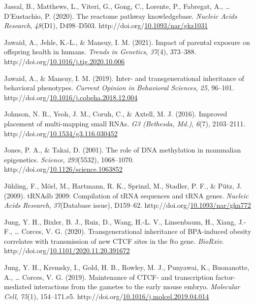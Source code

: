 \documentclass[12pt,twoside]{reedthesis}
\newlength{\cslhangindent}
\newenvironment{CSLReferences}[2] %
 {%
  \setlength{\parindent}{0pt}
  \ifodd #1 \everypar{\setlength{\hangindent}{\cslhangindent}}\ignorespaces\fi
  \ifnum #2 > 0
  \setlength{\parskip}{#2\baselineskip}
  \fi
 }%
 {}
\begin{document}
\begin{CSLReferences}{1}{0}
\leavevmode{}%
Jassal, B., Matthews, L., Viteri, G., Gong, C., Lorente, P., Fabregat, A., \ldots{} D'Eustachio, P. (2020). The reactome pathway knowledgebase. \emph{Nucleic Acids Research}, \emph{48}(D1), D498--D503. http://doi.org/\href{https://doi.org/10.1093/nar/gkz1031}{10.1093/nar/gkz1031}

\leavevmode{}%
Jawaid, A., Jehle, K.-L., \& Mansuy, I. M. (2021). Impact of parental exposure on offspring health in humans. \emph{Trends in Genetics}, \emph{37}(4), 373--388. http://doi.org/\href{https://doi.org/10.1016/j.tig.2020.10.006}{10.1016/j.tig.2020.10.006}

\leavevmode{}%
Jawaid, A., \& Mansuy, I. M. (2019). Inter- and transgenerational inheritance of behavioral phenotypes. \emph{Current Opinion in Behavioral Sciences}, \emph{25}, 96--101. http://doi.org/\href{https://doi.org/10.1016/j.cobeha.2018.12.004}{10.1016/j.cobeha.2018.12.004}

\leavevmode{}%
Johnson, N. R., Yeoh, J. M., Coruh, C., \& Axtell, M. J. (2016). Improved placement of multi-mapping small RNAs. \emph{G3 (Bethesda, Md.)}, \emph{6}(7), 2103--2111. http://doi.org/\href{https://doi.org/10.1534/g3.116.030452}{10.1534/g3.116.030452}

\leavevmode{}%
Jones, P. A., \& Takai, D. (2001). The role of DNA methylation in mammalian epigenetics. \emph{Science}, \emph{293}(5532), 1068--1070. http://doi.org/\href{https://doi.org/10.1126/science.1063852}{10.1126/science.1063852}

\leavevmode{}%
Jühling, F., Mörl, M., Hartmann, R. K., Sprinzl, M., Stadler, P. F., \& Pütz, J. (2009). tRNAdb 2009: Compilation of tRNA sequences and tRNA genes. \emph{Nucleic Acids Research}, \emph{37}(Database issue), D159--62. http://doi.org/\href{https://doi.org/10.1093/nar/gkn772}{10.1093/nar/gkn772}

\leavevmode{}%
Jung, Y. H., Bixler, B. J., Ruiz, D., Wang, H.-L. V., Linsenbaum, H., Xiang, J.-F., \ldots{} Corces, V. G. (2020). Transgenerational inheritance of BPA-induced obesity correlates with transmission of new CTCF sites in the fto gene. \emph{BioRxiv}. http://doi.org/\href{https://doi.org/10.1101/2020.11.20.391672}{10.1101/2020.11.20.391672}

\leavevmode{}%
Jung, Y. H., Kremsky, I., Gold, H. B., Rowley, M. J., Punyawai, K., Buonanotte, A., \ldots{} Corces, V. G. (2019). Maintenance of CTCF- and transcription factor-mediated interactions from the gametes to the early mouse embryo. \emph{Molecular Cell}, \emph{75}(1), 154--171.e5. http://doi.org/\href{https://doi.org/10.1016/j.molcel.2019.04.014}{10.1016/j.molcel.2019.04.014}


\end{CSLReferences}
\end{document}
